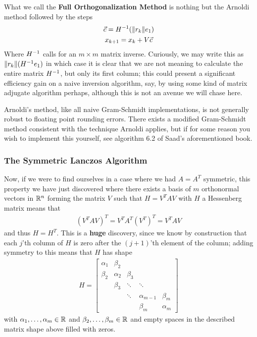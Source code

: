 \documentclass[11pt]{article}
\begin{document}
What we call the \textbf{Full Orthogonalization Method} is nothing but the Arnoldi method followed by the steps \begin{gather*}
\vec c = H^{-1} (\lVert r_k \rVert e_1) \\
x_{k+1} = x_k + V \vec c
\end{gather*}
Where $H^{-1}$ calls for an $m \times m$ matrix inverse. Curiously, we may write this as $\lVert r_k \rVert (H^{-1} e_1) $ in which case it is clear that we are not meaning to calculate the entire matrix $H^{-1}$, but only its first column; this could present a significant efficiency gain on a naive inversion algorithm, say, by using some kind of matrix adjugate algorithm perhaps, although this is not an avenue we will chase here.

Arnoldi's method, like all naive Gram-Schmidt implementations, is not generally robust to floating point rounding errors. There exists a modified Gram-Schmidt method consistent with the technique Arnoldi applies, but if for some reason you wish to implement this yourself, see algorithm 6.2 of Saad's aforementioned book.

\subsubsection{The Symmetric Lanczos Algorithm}

Now, if we were to find ourselves in a case where we had $A = A^T$ symmetric, this property we have just discovered where there exists a basis of $m$ orthonormal vectors in $\mathbb{R}^n$ forming the matrix $V$ such that $H = V^T A V$ with $H$ a Hessenberg matrix means that \begin{gather*}
(V^T A V)^T = V^T A^T (V^T)^T = V^T A V
\end{gather*}
and thus $H = H^T$. This is a \textbf{huge} discovery, since we know by construction that each $j$'th column of $H$ is zero after the $(j+1)$'th element of the column; adding symmetry to this means that $H$ has shape \begin{gather*}
H = \begin{bmatrix} \alpha_1 & \beta_2 & & & \\ \beta_2 & \alpha_2 & \beta_3 & & \\ & \beta_3 & \ddots & \ddots & \\ & & \ddots & \alpha_{m-1} & \beta_m \\ & & & \beta_m & \alpha_m \end{bmatrix}
\end{gather*}
with $\alpha_1, \dots, \alpha_m \in \mathbb{R}$ and $\beta_2, \dots, \beta_m \in \mathbb{R}$ and empty spaces in the described matrix shape above filled with zeros.
\end{document}
